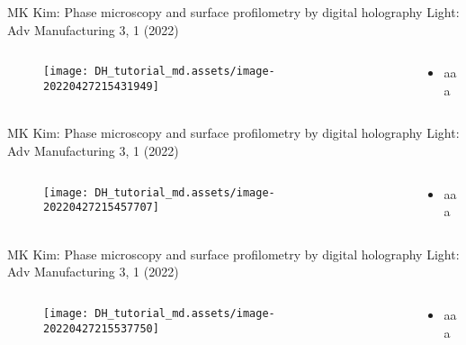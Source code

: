 \documentclass[t, aspectratio=169]{beamer}
\begin{document}
\begin{frame}{MK Kim: Phase microscopy and surface profilometry by digital holography}
	\vspace{-3 mm}
	\small Light: Adv Manufacturing 3, 1 (2022)
	\begin{columns}
		\begin{column}{.6\textwidth}
			\begin{figure}
				\texttt{[image: DH\_tutorial\_md.assets/image-20220427215431949]}
			\end{figure}
		\end{column}
		\begin{column}{.4\textwidth}
			\begin{itemize}
				\item aaa
			\end{itemize}
		\end{column}
	\end{columns}
\end{frame}


\begin{frame}{MK Kim: Phase microscopy and surface profilometry by digital holography}
	\vspace{-3 mm}
	\small Light: Adv Manufacturing 3, 1 (2022)
	\begin{columns}
		\begin{column}{.6\textwidth}
			\begin{figure}
				\texttt{[image: DH\_tutorial\_md.assets/image-20220427215457707]}
			\end{figure}
		\end{column}
		\begin{column}{.4\textwidth}
			\begin{itemize}
				\item aaa
			\end{itemize}
		\end{column}
	\end{columns}
\end{frame}


\begin{frame}{MK Kim: Phase microscopy and surface profilometry by digital holography}
	\vspace{-3 mm}
	\small Light: Adv Manufacturing 3, 1 (2022)
	\begin{columns}
		\begin{column}{.6\textwidth}
			\begin{figure}
				\texttt{[image: DH\_tutorial\_md.assets/image-20220427215537750]}
			\end{figure}
		\end{column}
		\begin{column}{.4\textwidth}
			\begin{itemize}
				\item aaa
			\end{itemize}
		\end{column}
	\end{columns}
\end{frame}
\end{document}
